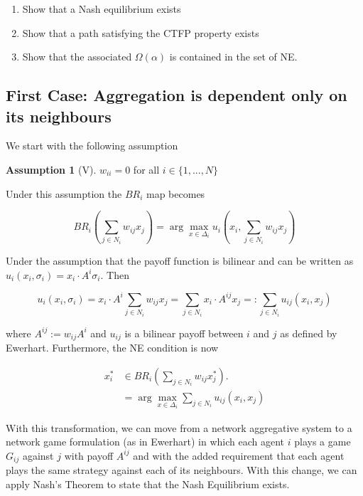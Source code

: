 \documentclass{article}
\theoremstyle{definition}
\newtheorem{assumption}{Assumption}
\begin{document}
	\begin{enumerate}
		\item Show that a Nash equilibrium exists
		\item Show that a path satisfying the CTFP property exists
		\item Show that the associated $\Omega(\alpha)$ is contained in the set of NE.

	\end{enumerate}

	\newpage
	
	\subsection*{First Case: Aggregation is dependent only on its neighbours}
	
	We start with the following assumption
	
	\begin{assumption}[V]
	$w_{ii} = 0$ for all $i \in \{ 1, ..., N \}$
	\end{assumption}
	
	Under this assumption the $BR_i$ map becomes
	
	\begin{equation}
		BR_i(\sum_{j \in N_i} w_{ij} x_j) = \arg\max_{x \in \Delta_i} u_i(x_i,\sum_{j \in N_i} w_{ij} x_j)
	\end{equation}
	
	Under the assumption that the payoff function is bilinear and can be written as $u_i(x_i, \sigma_i) = x_i \cdot A^i \sigma_i$. Then 
	
	\begin{equation*}
		u_i(x_i, \sigma_i) = x_i \cdot A^i \sum_{j \in N_i} w_{ij} x_j = \sum_{j \in N_i} x_i \cdot A^{ij} x_j =: \sum_{j \in N_i} u_{ij}(x_i, x_j) 
	\end{equation*}
	
	where $A^{ij} := w_{ij} A^i$ and $u_{ij}$ is a bilinear payoff between $i$ and $j$ as defined by Ewerhart. Furthermore, the NE condition is now
	
	\begin{align}
			x_i^* & \in BR_i(\sum_{j \in N_i} w_{ij} x_j^*). \\
			& = \arg \max_{x \in \Delta_i} \sum_{j \in N_i} u_{ij}(x_i, x_j) 
	\end{align}
	
	 With this transformation, we can move from a network aggregative system to a network game formulation (as in Ewerhart) in which each agent $i$ plays a game $G_{ij}$ against $j$ with payoff $A^{ij}$ and with the added requirement that each agent plays the same strategy against each of its neighbours. With this change, we can apply Nash's Theorem to state that the Nash Equilibrium exists.
	
\end{document}
